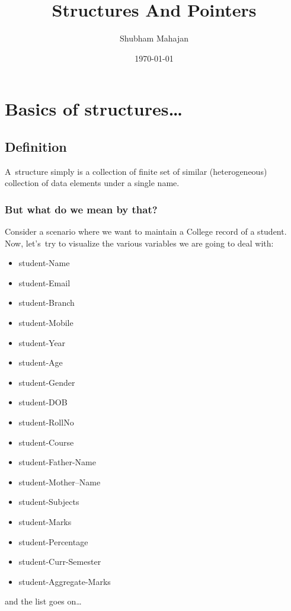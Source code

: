 \documentclass[11pt]{article}
\author{Shubham Mahajan}
\date{\today}
\title{Structures And Pointers}
\begin{document}
\maketitle
\tableofcontents


\section{Basics of structures…}
\label{sec:org6e8b31f}

\subsection{Definition}
\label{sec:org1edaaae}

A structure simply is a collection of finite set of similar (heterogeneous)
collection of data elements under a single name.

\subsubsection{But what do we mean by that?}
\label{sec:org978f67f}

Consider a scenario where we want to maintain a College record of a student.
Now, let’s try to visualize the various variables we are going to deal with:

\begin{itemize}
\item student-Name
\item student-Email
\item student-Branch
\item student-Mobile
\item student-Year
\item student-Age
\item student-Gender
\item student-DOB
\item student-RollNo
\item student-Course
\item student-Father-Name
\item student-Mother–Name
\item student-Subjects
\item student-Marks
\item student-Percentage
\item student-Curr-Semester
\item student-Aggregate-Marks
\end{itemize}

and the list goes on…
\end{document}
